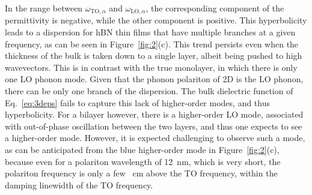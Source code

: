 \documentclass[aps,prb,twocolumn,
	           groupedaddress,superscriptaddress,
               amsfonts,amssymb,amsmath,floatfix,
	           citeautoscript]{revtex4-1}
\begin{document}
In the range between $\omega_{\mathrm{TO}, \alpha}$ and $\omega_{\mathrm{LO}, \alpha}$, the corresponding component of the permittivity is negative, while the other component is positive. This hyperbolicity leads to a dispersion for hBN thin films that have multiple branches at a given frequency, as can be seen in Figure~\ref{fig:2}(c).  This trend persists even when the thickness of the bulk is taken down to a single layer, albeit being pushed to high wavevectors. This is in contrast with the true monolayer, in which there is only one LO phonon mode. Given that the phonon polariton of 2D is the LO phonon, there can be only one branch of the dispersion. The bulk dielectric function of Eq.~\eqref{eq:3deps} fails to capture this lack of higher-order modes, and thus hyperbolicity. For a bilayer however, there is a higher-order LO mode, associated with out-of-phase oscillation between the two layers, and thus one expects to see a higher-order mode. However, it is expected challenging to observe such a mode, as can be anticipated from the blue higher-order mode in Figure~\ref{fig:2}(c), because even for a polariton wavelength of \SI{12}{\nm}, which is very short, the polariton frequency is only a few \si{\per\cm} above the TO frequency, within the damping linewidth of the TO frequency. %
\end{document}
